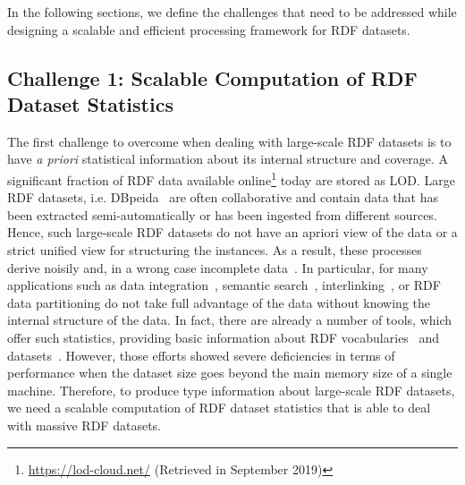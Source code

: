 In the following sections, we define the challenges that need to be addressed while designing a scalable and efficient processing framework for \gls{RDF} datasets.

\subsection{Challenge 1: Scalable Computation of RDF Dataset Statistics}
\label{sec:c1}
The first challenge to overcome when dealing with large-scale RDF datasets is to have \textit{a priori} statistical information about its internal structure and coverage.
A significant fraction of RDF data available online\footnote{\scriptsize \url{https://lod-cloud.net/} (Retrieved in September 2019)} today are stored as \gls{LOD}.
Large \gls{RDF} datasets, i.e. DBpeida~\cite{dbpedia-swj} are often collaborative and contain data that has been extracted semi-automatically or has been ingested from different sources.
Hence, such large-scale \gls{RDF} datasets do not have an apriori view of the data or a strict unified view for structuring the instances.
As a result, these processes derive noisily and, in a wrong case incomplete data~\cite{zaveri2015quality}.
In particular, for many applications such as data integration~\cite{michel:tel-01508602}, semantic search~\cite{Tonon2012CII}, interlinking~\cite{Dutta2014PAI}, or \gls{RDF} data partitioning do not take full advantage of the data without knowing the internal structure of the data.
In fact, there are already a number of tools, which offer such statistics, providing basic information about \gls{RDF} vocabularies~\cite{vandenbussche2015linked} and datasets~\cite{conf/dexaw/LangeggerW09,ermilov-2013-kesw}.
However, those efforts showed severe deficiencies in terms of performance when the dataset size goes beyond the main memory size of a single machine.
Therefore, to produce type information about large-scale \gls{RDF} datasets, we need a scalable computation of RDF dataset statistics that is able to deal with massive \gls{RDF} datasets.


